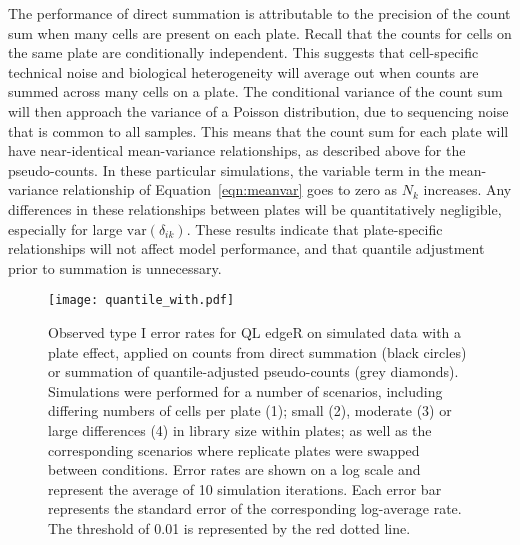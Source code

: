 \documentclass{article}
\begin{document}
The performance of direct summation is attributable to the precision of the count sum when many cells are present on each plate.
Recall that the counts for cells on the same plate are conditionally independent. 
This suggests that cell-specific technical noise and biological heterogeneity will average out when counts are summed across many cells on a plate.
The conditional variance of the count sum will then approach the variance of a Poisson distribution, due to sequencing noise \cite{marioni2008rnaseq} that is common to all samples.
This means that the count sum for each plate will have near-identical mean-variance relationships, as described above for the pseudo-counts.
In these particular simulations, the variable term in the mean-variance relationship of Equation~\ref{eqn:meanvar} goes to zero as $N_k$ increases.
Any differences in these relationships between plates will be quantitatively negligible, especially for large $\mbox{var}(\delta_{ik})$.
These results indicate that plate-specific relationships will not affect model performance, and that quantile adjustment prior to summation is unnecessary.

\begin{figure}[tbp]
\begin{center}
\texttt{[image: quantile\_with.pdf]}
\end{center}
\caption{
    Observed type I error rates for QL edgeR on simulated data with a plate effect, 
        applied on counts from direct summation (black circles) or summation of quantile-adjusted pseudo-counts (grey diamonds). 
    Simulations were performed for a number of scenarios, including differing numbers of cells per plate (1);
        small (2), moderate (3) or large differences (4) in library size within plates;
        as well as the corresponding scenarios where replicate plates were swapped between conditions.
    Error rates are shown on a log scale and represent the average of 10 simulation iterations.
    Each error bar represents the standard error of the corresponding log-average rate.
    The threshold of 0.01 is represented by the red dotted line.
}
\label{fig:complexplate}
\end{figure}

\end{document}
